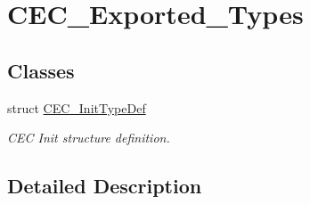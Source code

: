 \hypertarget{group___c_e_c___exported___types}{}\section{C\+E\+C\+\_\+\+Exported\+\_\+\+Types}
\label{group___c_e_c___exported___types}
\subsection*{Classes}
\begin{DoxyCompactItemize}
\item 
struct \hyperlink{struct_c_e_c___init_type_def}{C\+E\+C\+\_\+\+Init\+Type\+Def}
\begin{DoxyCompactList}\small\item\em C\+EC Init structure definition. \end{DoxyCompactList}\end{DoxyCompactItemize}


\subsection{Detailed Description}
